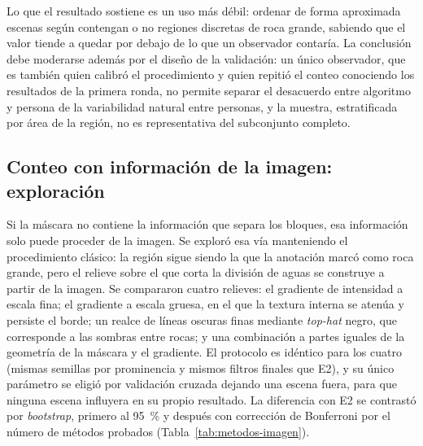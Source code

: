 Lo que el resultado sostiene es un uso más débil: ordenar de forma aproximada escenas según
contengan o no regiones discretas de roca grande, sabiendo que el valor tiende a quedar por
debajo de lo que un observador contaría. La conclusión debe moderarse además por el diseño de la
validación: un único observador, que es también quien calibró el procedimiento y quien repitió el
conteo conociendo los resultados de la primera ronda, no permite separar el desacuerdo entre
algoritmo y persona de la variabilidad natural entre personas, y la muestra, estratificada por
área de la región, no es representativa del subconjunto completo.

\subsection{Conteo con información de la imagen: exploración}
\label{sec:hibrido}

Si la máscara no contiene la información que separa los bloques, esa información solo puede
proceder de la imagen. Se exploró esa vía manteniendo el procedimiento clásico: la región
sigue siendo la que la anotación marcó como roca grande, pero el relieve sobre el que corta la
división de aguas se construye a partir de la imagen. Se compararon cuatro relieves: el
gradiente de intensidad a escala fina; el gradiente a escala gruesa, en el que la textura
interna se atenúa y persiste el borde; un realce de líneas oscuras finas mediante
\textit{top-hat} negro, que corresponde a las sombras entre rocas; y una combinación a partes
iguales de la geometría de la máscara y el gradiente. El protocolo es idéntico para los cuatro
(mismas semillas por prominencia y mismos filtros finales que E2), y su único parámetro se
eligió por validación cruzada dejando una escena fuera, para que ninguna escena influyera en su
propio resultado. La diferencia con E2 se contrastó por \textit{bootstrap}, primero al
\SI{95}{\percent} y después con corrección de Bonferroni por el número de métodos probados
(Tabla~\ref{tab:metodos-imagen}).


